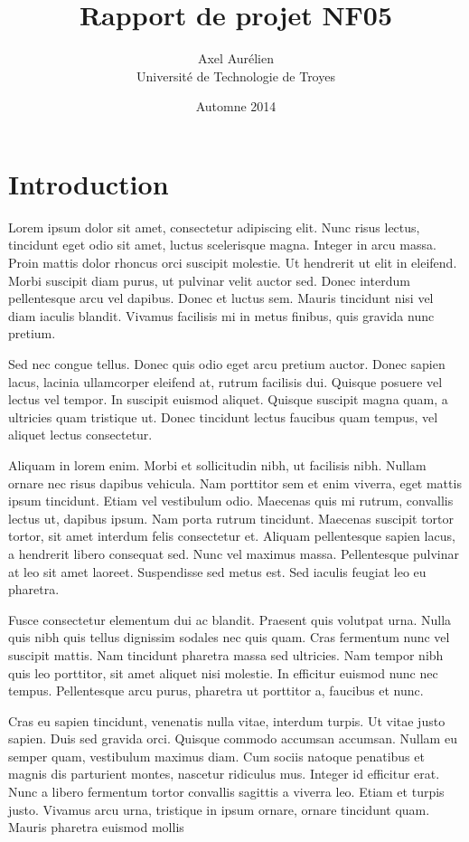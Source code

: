 \documentclass{report}
\title{Rapport de projet NF05}
\author{Axel \bsc{Mousset} Aurélien \bsc{Labate} \\ Université de Technologie de Troyes}
\date{Automne 2014}
\begin{document}
    \maketitle
    \tableofcontents

    \chapter{Introduction}
        Lorem ipsum dolor sit amet, consectetur adipiscing elit. Nunc risus lectus, tincidunt eget odio sit amet, luctus scelerisque magna. Integer in arcu massa. Proin mattis dolor rhoncus orci suscipit molestie. Ut hendrerit ut elit in eleifend. Morbi suscipit diam purus, ut pulvinar velit auctor sed. Donec interdum pellentesque arcu vel dapibus. Donec et luctus sem. Mauris tincidunt nisi vel diam iaculis blandit. Vivamus facilisis mi in metus finibus, quis gravida nunc pretium.

        Sed nec congue tellus. Donec quis odio eget arcu pretium auctor. Donec sapien lacus, lacinia ullamcorper eleifend at, rutrum facilisis dui. Quisque posuere vel lectus vel tempor. In suscipit euismod aliquet. Quisque suscipit magna quam, a ultricies quam tristique ut. Donec tincidunt lectus faucibus quam tempus, vel aliquet lectus consectetur.

        Aliquam in lorem enim. Morbi et sollicitudin nibh, ut facilisis nibh. Nullam ornare nec risus dapibus vehicula. Nam porttitor sem et enim viverra, eget mattis ipsum tincidunt. Etiam vel vestibulum odio. Maecenas quis mi rutrum, convallis lectus ut, dapibus ipsum. Nam porta rutrum tincidunt. Maecenas suscipit tortor tortor, sit amet interdum felis consectetur et. Aliquam pellentesque sapien lacus, a hendrerit libero consequat sed. Nunc vel maximus massa. Pellentesque pulvinar at leo sit amet laoreet. Suspendisse sed metus est. Sed iaculis feugiat leo eu pharetra.

        Fusce consectetur elementum dui ac blandit. Praesent quis volutpat urna. Nulla quis nibh quis tellus dignissim sodales nec quis quam. Cras fermentum nunc vel suscipit mattis. Nam tincidunt pharetra massa sed ultricies. Nam tempor nibh quis leo porttitor, sit amet aliquet nisi molestie. In efficitur euismod nunc nec tempus. Pellentesque arcu purus, pharetra ut porttitor a, faucibus et nunc.

        Cras eu sapien tincidunt, venenatis nulla vitae, interdum turpis. Ut vitae justo sapien. Duis sed gravida orci. Quisque commodo accumsan accumsan. Nullam eu semper quam, vestibulum maximus diam. Cum sociis natoque penatibus et magnis dis parturient montes, nascetur ridiculus mus. Integer id efficitur erat. Nunc a libero fermentum tortor convallis sagittis a viverra leo. Etiam et turpis justo. Vivamus arcu urna, tristique in ipsum ornare, ornare tincidunt quam. Mauris pharetra euismod mollis
\end{document}
